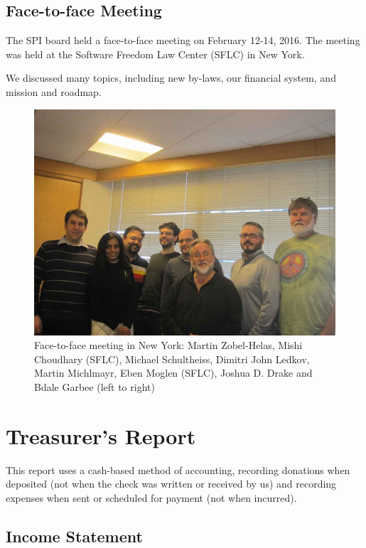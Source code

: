 \documentclass[letterpaper]{report}
\begin{document}
\section{Face-to-face Meeting}

The SPI board held a face-to-face meeting on February 12-14, 2016.
The meeting was held at the Software Freedom Law Center (SFLC) in New
York.

We discussed many topics, including new by-laws, our financial system,
and mission and roadmap.

\begin{figure}[h]
\centering

\includegraphics[scale=1.00]{images/2016-f2f}

\caption{Face-to-face meeting in New York: Martin Zobel-Helas, Mishi
Choudhary (SFLC), Michael Schultheiss, Dimitri John Ledkov, Martin
Michlmayr, Eben Moglen (SFLC), Joshua D. Drake and Bdale Garbee (left to
right)}

\end{figure}

\chapter{Treasurer's Report}

This report uses a cash-based method of accounting, recording donations when
deposited (not when the check was written or received by us) and recording
expenses when sent or scheduled for payment (not when incurred).

\section{Income Statement}
\end{document}
